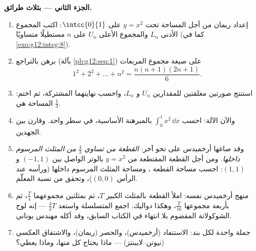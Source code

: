 \begin{problem}
\medskip
\noindent\textbf{الجزء الثاني ---  بثلاث طرائق.}
\begin{enumerate}[resume]
  \item إعداد ريمان من أجل المساحة تحت $y = x^2$ على
        $\intcc{0}{1}$: اكتب المجموع الأدنى $L_n$ والمجموع
        الأعلى $U_n$ على $n$ مستطيلًا متساويًا (كما في
        \cref{exo:g12:integ:8}).
  \item برهن بالتراجع (بآلة \cref{pb:g12:seq:1}) على
        صيغة مجموع المربعات
        \[
        1^2 + 2^2 + \dots + n^2 = \frac{n(n+1)(2n+1)}{6} .
        \]
  \item استنتج صورتين مغلقتين للمقدارين $U_n$ و $L_n$، واحسب
        نهايتهما المشتركة، ثم اختم: المساحة هي $\frac13$.
  \item والآن الآلة: احسب
        $\int_0^1 x^2\,\dd x$ بالمبرهنة الأساسية، في
        سطر واحد. وقارن بين الجهدين.
  \item وقد صاغها أرخميدس على نحو آخر: \emph{القطعة من  تساوي $\frac43$ من المثلث المرسوم داخلها}. ومن أجل
        القطعة المقتطعة من $y = x^2$ بالوتر الواصل بين
        $(-1, 1)$ و $(1, 1)$: احسب مساحة القطعة
        ، ومساحة المثلث المرسوم داخلها (ورأسه عند
        الرأس $(0, 0)$)، وتحقق من نسبة المعلّم.
  \item منهج أرخميدس نفسه: املأ القطعة بالمثلث
        الكبير $T$، ثم بمثلثين مجموعهما
        $\frac T4$، ثم بأربعة مجموعها $\frac{T}{16}$، وهكذا
        دواليك. اجمع المتسلسلة  واستعد
        $\frac43 T$ --- إنه لوح الشوكولاتة المقضوم بلا انتهاء في
        الكتاب السابق، وقد أكله مهندس يوناني.
  \item جملة واحدة لكل بند: الاستنفاد (أرخميدس)، والحصر
        (ريمان)، والاشتقاق العكسي (نيوتن--لايبنتز) ---
        ماذا يحتاج كل منها، وماذا يعطي؟
\end{enumerate}


\end{problem}
